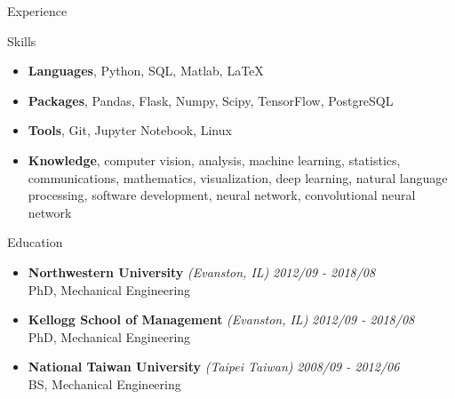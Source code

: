 \documentclass{resume} %
\begin{document}
\begin{rSection}{Experience}
\begin{itemize}
	
	\end{itemize}

\end{rSection}

\begin{rSection}{Skills}
\begin{itemize}
	\item {\bf Languages}{, Python, SQL, Matlab, LaTeX}
	\item {\bf Packages}{, Pandas, Flask, Numpy, Scipy, TensorFlow, PostgreSQL}
	\item {\bf Tools}{, Git, Jupyter Notebook, Linux}
	\item {\bf Knowledge}{, computer vision, analysis, machine learning, statistics, communications, mathematics, visualization, deep learning, natural language processing, software development, neural network, convolutional neural network}
	
\end{itemize}
\end{rSection}

\begin{rSection}{Education}
\begin{itemize}
	\item {\bf Northwestern University} \textit{(Evanston, IL)} \hfill {\em 2012/09 - 2018/08} 
	\\ PhD, Mechanical Engineering
	\item {\bf Kellogg School of Management} \textit{(Evanston, IL)} \hfill {\em 2012/09 - 2018/08} 
	\\ PhD, Mechanical Engineering
	\item {\bf National Taiwan University} \textit{(Taipei Taiwan)} \hfill {\em 2008/09 - 2012/06} 
	\\ BS, Mechanical Engineering
\end{itemize}



\end{rSection}
\end{document}
